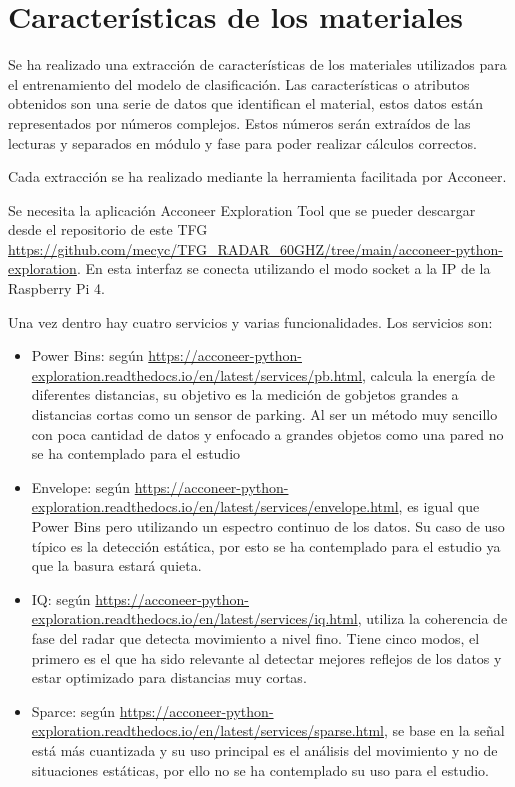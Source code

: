 \section{Características de los materiales}

Se ha realizado una extracción de características de los materiales utilizados para el entrenamiento del modelo de clasificación. Las características o atributos obtenidos son una serie de datos que identifican el material, estos datos están representados por números complejos. Estos números serán extraídos de las lecturas y separados en módulo y fase para poder realizar cálculos correctos.

Cada extracción se ha realizado mediante la herramienta facilitada por Acconeer.



Se necesita la aplicación Acconeer Exploration Tool que se pueder descargar desde el repositorio de este TFG \url{https://github.com/mecyc/TFG_RADAR_60GHZ/tree/main/acconeer-python-exploration}. En esta interfaz se conecta utilizando el modo socket a la IP de la Raspberry Pi 4.
 
Una vez dentro hay cuatro servicios y varias funcionalidades. Los servicios son:
\begin{itemize}
\item Power Bins: según \url{https://acconeer-python-exploration.readthedocs.io/en/latest/services/pb.html}, calcula la energía de diferentes distancias, su objetivo es la medición de gobjetos grandes a distancias cortas como un sensor de parking. Al ser un método muy sencillo con poca cantidad de datos y enfocado a grandes objetos como una pared no se ha contemplado para el estudio
\item Envelope: según \url{https://acconeer-python-exploration.readthedocs.io/en/latest/services/envelope.html}, es igual que Power Bins pero utilizando un espectro continuo de los datos. Su caso de uso típico es la detección estática, por esto se ha contemplado para el estudio ya que la basura estará quieta.
\item IQ: según \url{https://acconeer-python-exploration.readthedocs.io/en/latest/services/iq.html}, utiliza la coherencia de fase del radar que detecta movimiento a nivel fino. Tiene cinco modos, el primero es el que ha sido relevante al detectar mejores reflejos de los datos y estar optimizado para distancias muy cortas.
\item Sparce: según \url{https://acconeer-python-exploration.readthedocs.io/en/latest/services/sparse.html}, se base en la señal está más cuantizada y su uso principal es el análisis del movimiento y no de situaciones estáticas, por ello no se ha contemplado su uso para el estudio.
\end{itemize}


